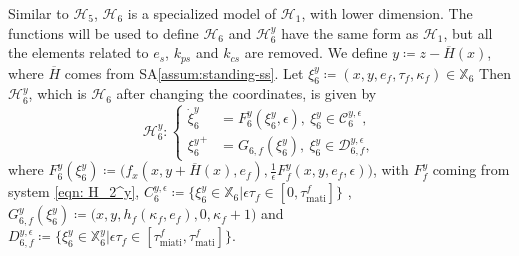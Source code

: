 Similar to $\mathcal{H}_5$, $\mathcal{H}_6$ is a specialized model of $\mathcal{H}_1$, with lower dimension. The functions will be used to define $\mathcal{H}_6$ and $\mathcal{H}_6^y$ have the same form as $\mathcal{H}_1$, but all the elements related to $e_s$, $k_{ps}$ and $k_{cs}$ are removed.
We define $y \coloneqq z - \overline{H}(x)$, where $\overline{H}$ comes from SA\ref{assum:standing-ss}. Let $\xi_6^y \coloneqq (x,y,e_f,\tau_f, \kappa_f) \in \mathbb{X}_6$
Then $\mathcal{H}_6^y$, which is $\mathcal{H}_6$ after changing the coordinates, is given by 
\begin{equation*}
    \mathcal{H}_6^y:\left\{
\begin{aligned}
    \dot{\xi}_6^y &= F_6^y(\xi_6^y, \epsilon),\ \xi_6^y \in \mathcal{C}_6^{y,\epsilon}, \\
    {\xi_6^y}^+ &= G_{6,f}(\xi_6^y), \ \xi_6^y\in \mathcal{D}_{6,f}^{y,\epsilon},
\end{aligned}
    \right.
\end{equation*}
where  $F_6^y(\xi_6^y) \coloneqq \big(f_x(x,y+\overline{H}(x),e_f), \tfrac{1}{\epsilon} F_f^y(x,y,e_f,\epsilon) \big)$,
with $F_f^y$ coming from system \eqref{eqn: H_2^y}, $C_6^{y,\epsilon} \coloneqq \{ \xi_6^y \in \mathbb{X}_6 |\epsilon \tau_f \in [0, \tau_{\text{mati}}^f]\}$ , $G_{6,f}^y(\xi_6^y) \coloneqq \big(x, y,h_f(\kappa_f, e_f), 0, \kappa_f + 1\big)$ and $D_{6,f}^{y,\epsilon} \coloneqq \{ \xi_6^y \in \mathbb{X}_6^y | \epsilon \tau_f \in [\tau_{\text{miati}}^f, \tau_{\text{mati}}^f]\}$.


